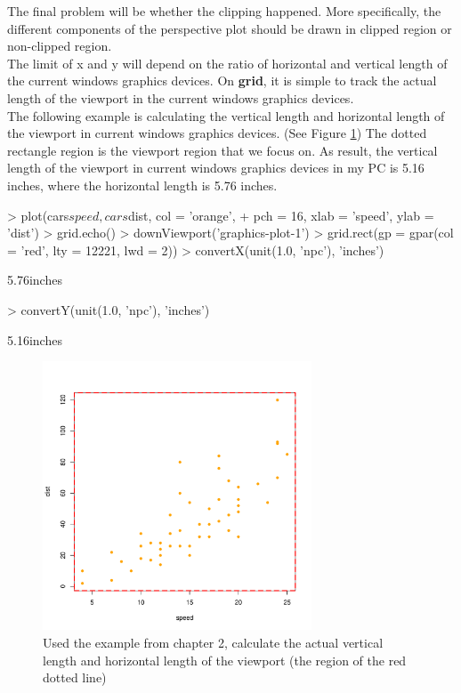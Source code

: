 \documentclass[11pt]{report}
\begin{document}
The final problem will be whether the clipping happened. More specifically, the different components of the perspective plot should be drawn in clipped region or non-clipped region.\\

The limit of x and y will depend on the ratio of horizontal and vertical length of the current windows graphics devices. On \textbf{grid}, it is simple to track the actual length of the viewport in the current windows graphics devices. \\

The following example is calculating the vertical length and horizontal length of the viewport in current windows graphics devices. (See Figure \ref{figure_4.2}) The dotted rectangle region is the viewport region that we focus on. As result, the vertical length of the viewport in current windows graphics devices in my PC is 5.16 inches, where the horizontal length is 5.76 inches. 
\begin{Schunk}
\begin{Sinput}
> plot(cars$speed, cars$dist, col = 'orange', 
+       pch = 16, xlab = 'speed', ylab = 'dist')
> grid.echo()
> downViewport('graphics-plot-1')
> grid.rect(gp = gpar(col = 'red', lty = 12221, lwd = 2))
> convertX(unit(1.0, 'npc'), 'inches')
\end{Sinput}
\begin{Soutput}
[1] 5.76inches
\end{Soutput}
\begin{Sinput}
> convertY(unit(1.0, 'npc'), 'inches')
\end{Sinput}
\begin{Soutput}
[1] 5.16inches
\end{Soutput}
\end{Schunk}

\begin{figure}[h]
	\begin{center}
		\includegraphics[height = 8cm, width = 8cm]{figure/gridGraphics_persp_demo_1.pdf}
		\caption{Used the example from chapter 2, calculate the actual vertical length and horizontal length of the viewport (the region of the red dotted line)}
		\label{figure_4.2}
	\end{center}
\end{figure}
\end{document}
